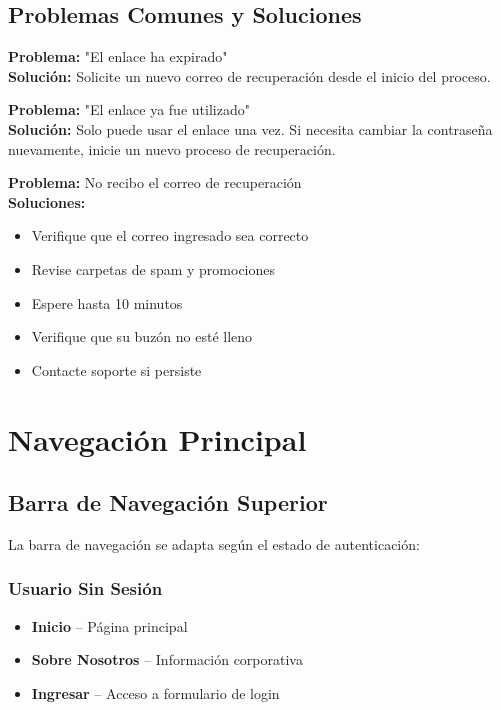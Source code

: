\documentclass[11pt,a4paper,twoside]{book}
\begin{document}
\section{Problemas Comunes y Soluciones}

\begin{errorbox}
\textbf{Problema:} "El enlace ha expirado"\\
\textbf{Solución:} Solicite un nuevo correo de recuperación desde el inicio del proceso.
\end{errorbox}

\begin{errorbox}
\textbf{Problema:} "El enlace ya fue utilizado"\\
\textbf{Solución:} Solo puede usar el enlace una vez. Si necesita cambiar la contraseña nuevamente, inicie un nuevo proceso de recuperación.
\end{errorbox}

\begin{errorbox}
\textbf{Problema:} No recibo el correo de recuperación\\
\textbf{Soluciones:}
\begin{itemize}
    \item Verifique que el correo ingresado sea correcto
    \item Revise carpetas de spam y promociones
    \item Espere hasta 10 minutos
    \item Verifique que su buzón no esté lleno
    \item Contacte soporte si persiste
\end{itemize}
\end{errorbox}

\chapter{Navegación Principal}

\section{Barra de Navegación Superior}

La barra de navegación se adapta según el estado de autenticación:

\subsection{Usuario Sin Sesión}
\begin{itemize}
    \item \textbf{Inicio} -- Página principal
    \item \textbf{Sobre Nosotros} -- Información corporativa
    \item \textbf{Ingresar} -- Acceso a formulario de login
\end{itemize}
\end{document}

